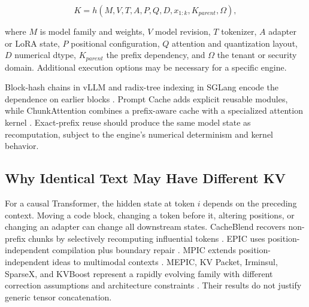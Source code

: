 \documentclass[conference,10pt]{IEEEtran}
\begin{document}
\begin{equation}
K = h(M,V,T,A,P,Q,D,x_{1:k},K_{parent},\Omega),
\label{eq:key}
\end{equation}

where $M$ is model family and weights, $V$ model revision, $T$ tokenizer, $A$ adapter or LoRA state, $P$ positional configuration, $Q$ attention and quantization layout, $D$ numerical dtype, $K_{parent}$ the prefix dependency, and $\Omega$ the tenant or security domain. Additional execution options may be necessary for a specific engine.

Block-hash chains in vLLM and radix-tree indexing in SGLang encode the dependence on earlier blocks \cite{d02vllmproject,zheng2023sglang}. Prompt Cache adds explicit reusable modules, while ChunkAttention combines a prefix-aware cache with a specialized attention kernel \cite{gim2023prompt,ye2024chunkattention}. Exact-prefix reuse should produce the same model state as recomputation, subject to the engine's numerical determinism and kernel behavior.

\subsection{Why Identical Text May Have Different KV}

For a causal Transformer, the hidden state at token $i$ depends on the preceding context. Moving a code block, changing a token before it, altering positions, or changing an adapter can change all downstream states. CacheBlend recovers non-prefix chunks by selectively recomputing influential tokens \cite{yao2024cacheblend}. EPIC uses position-independent compilation plus boundary repair \cite{hu2024epic}. MPIC extends position-independent ideas to multimodal contexts \cite{zhao2025mpic}. MEPIC, KV Packet, Irminsul, SparseX, and KVBoost represent a rapidly evolving family with different correction assumptions and architecture constraints \cite{wang2025mepic,chen2026packet,ma2026irminsul,zhang2026sparsex,unnikrishnan2026kvboost}. Their results do not justify generic tensor concatenation.
\end{document}
